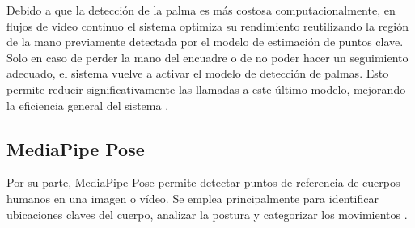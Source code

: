Debido a que la detección de la palma es más costosa computacionalmente, en flujos de video continuo el sistema optimiza su rendimiento reutilizando la región de la mano previamente detectada por el modelo de estimación de puntos clave. Solo en caso de perder la mano del encuadre o de no poder hacer un seguimiento adecuado, el sistema vuelve a activar el modelo de detección de palmas. Esto permite reducir significativamente las llamadas a este último modelo, mejorando la eficiencia general del sistema \cite{ref52}.\\

\subsection{MediaPipe Pose}
Por su parte, MediaPipe Pose permite detectar puntos de referencia de cuerpos humanos en una imagen o vídeo. Se emplea principalmente para identificar ubicaciones claves del cuerpo, analizar la postura y categorizar los movimientos \cite{ref53}.\\

